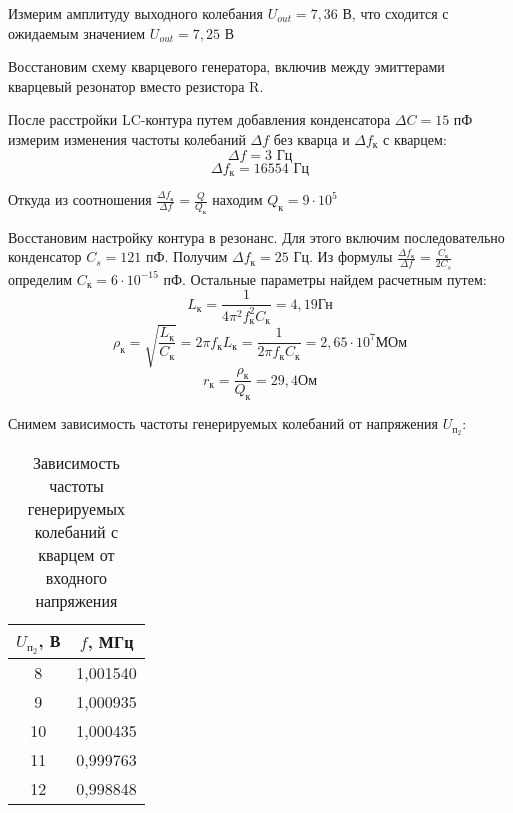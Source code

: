 \documentclass[a4paper,12pt]{report}
\begin{document}
Измерим амплитуду выходного колебания $U_{out} = 7,36$ В, что сходится с ожидаемым значением $U_{out} = 7,25$ В

Восстановим схему кварцевого генератора, включив между эмиттерами кварцевый резонатор вместо резистора R.

После расстройки LC-контура путем добавления конденсатора $\Delta C = 15$ пФ измерим изменения частоты колебаний $\Delta f$ без кварца и $\Delta f_{\text{к}}$ с кварцем:
\begin{equation*}
    \Delta f = 3 \text{ Гц}
\end{equation*}
\begin{equation*}
    \Delta f_{\text{к}} = 16554 \text{ Гц}
\end{equation*}

Откуда из соотношения $\frac{\Delta f_{\text{к}}}{\Delta f} = \frac{Q}{Q_{\text{к}}}$ находим $Q_{\text{к}} = 9 \cdot 10^{5}$

Восстановим настройку контура в резонанс. Для этого включим последовательно конденсатор $C_{s} = 121$ пФ. Получим $\Delta f_{\text{к}} = 25$ Гц. Из формулы $\frac{\Delta f_{\text{к}}}{\Delta f} = \frac{C_{\text{к}}}{2C_{s}}$ определим $C_{\text{к}} = 6\cdot 10^{-15}$ пФ. Остальные параметры найдем расчетным путем:
\begin{equation*}
    L_{\text{к}} = \frac{1}{4\pi^2 f_{\text{к}}^2 C_{\text{к}}} = 4,19 \text{Гн}
\end{equation*}
\begin{equation*}
    \rho_{\text{к}} = \sqrt{\frac{L_{\text{к}}}{C_{\text{к}}}} = 2\pi f_{\text{к}} L_{\text{к}} = \frac{1}{2\pi f_{\text{к}} C_{\text{к}}} = 2,65 \cdot 10^7 \text{МОм}
\end{equation*}
\begin{equation*}
    r_{\text{к}} = \frac{\rho_{\text{к}}}{Q_{\text{к}}} = 29,4 \text{Ом}
\end{equation*}

Снимем зависимость частоты генерируемых колебаний от напряжения $U_{\text{п}_2}$:

\begin{table}[H]
\begin{tabular}{|c|c|}
\hline
$U_{\text{п}_2}$, В & $f$, МГц   \\ \hline
8        & 1,001540 \\ \hline
9        & 1,000935 \\ \hline
10       & 1,000435 \\ \hline
11       & 0,999763 \\ \hline
12       & 0,998848 \\ \hline
\end{tabular}
\caption{Зависимость частоты генерируемых колебаний с кварцем от входного напряжения}
\end{table}
\end{document}
